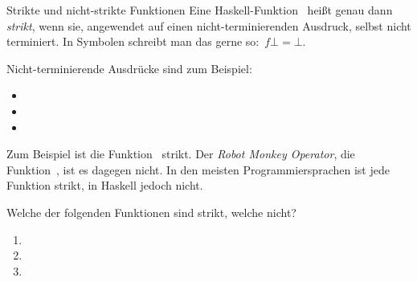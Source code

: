 \documentclass{uebblatt}
\begin{document}
\begin{aufgabe}{Strikte und nicht-strikte Funktionen}
Eine Haskell-Funktion~ heißt genau dann
\emph{strikt}, wenn sie, angewendet auf einen nicht-terminierenden Ausdruck,
selbst nicht terminiert. In Symbolen schreibt man das gerne
so:~$f \bot = \bot$.

Nicht-terminierende Ausdrücke sind zum Beispiel:
\begin{itemize}
\item {}
\item {}
\item {}
\end{itemize}

Zum Beispiel ist die Funktion~ strikt.
Der \emph{Robot Monkey Operator}, die Funktion~, ist es dagegen nicht. In den meisten Programmiersprachen ist jede
Funktion strikt, in Haskell jedoch nicht.

Welche der folgenden Funktionen sind strikt, welche nicht?
\begin{enumerate}
\item {}
\item {}
\item {}
\end{enumerate}
\end{aufgabe}
\end{document}
